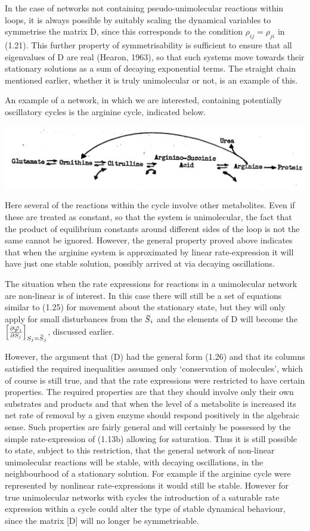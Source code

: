In the case of networks not containing pseudo-unimolecular reactions within loops, it is always possible by suitably scaling the dynamical variables to symmetrise the matrix D, since this corresponds to the condition $\rho_{ij} = \rho_{ji}$ in (1.21). This further property of symmetrisability is sufficient to ensure that all eigenvalues of D are real (Hearon, 1963), so that such systems move towards their stationary solutions as a sum of decaying exponential terms. The straight chain mentioned earlier, whether it is truly unimolecular or not, is an example of this.

An example of a network, in which we are interested, containing potentially oscillatory cycles is the arginine cycle, indicated below.

\includegraphics[scale=0.7]{figure1_argpathway}

Here several of the reactions within the cycle involve other metabolites. Even if these are treated as constant, so that the system is unimolecular, the fact that the product of equilibrium constants around different sides of the loop is not the same cannot be ignored. However, the general property proved above indicates that when the arginine system is approximated by linear rate-expression it will have just one stable solution, possibly arrived at via decaying oscillations.

The situation when the rate expressions for reactions in a unimolecular network are non-linear is of interest. In this case there will still be a set of equations similar to (1.25) for movement about the stationary state, but they will only apply for small disturbances from the $\,\overline{\!{S}}_i$ and the elements of D will become the $\left[\frac{\partial \varphi_i}{\partial S_j}\right]_{S_j=\olsi{S}_{j}}$, discussed earlier.

However, the argument that (D) had the general form (1.26) and that its columns satisfied the required inequalities assumed only `conservation of molecules', which of course is still true, and that the rate expressions were restricted to have certain properties. The required properties are that they should involve only their own substrates and products and that when the level of a metabolite is increased its net rate of removal by a given enzyme should respond positively in the algebraic sense. Such properties are fairly general and will certainly be possessed by the simple rate-expression of (1.13b) allowing for saturation. Thus it is still possible to state, subject to this restriction, that the general network of non-linear unimolecular reactions will be stable, with decaying oscillations, in the neighbourhood of a stationary solution. For example if the arginine cycle were represented by nonlinear rate-expressions it would still be stable. However for true unimolecular networks with cycles the introduction of a saturable rate expression within a cycle could alter the type of stable dynamical behaviour, since the matrix [D] will no longer be symmetrisable.

